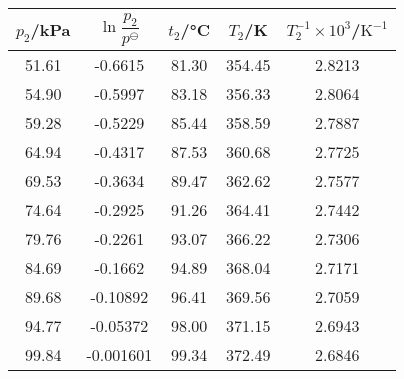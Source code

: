 \begin{table}[htbp]
    \centering
    \begin{tabular}{ccccc}
        \toprule
        $p_2$/\si{kPa} & $\ln\dfrac{p_2}{p^\ominus}$ & $t_2$/\si{\celsius} & $T_2$/\si{K} & $T_2^{-1}\times10^{3} $/$\mathrm{K^{-1}}$ \\
        \midrule
        51.61 & -0.6615 & 81.30 & 354.45 & 2.8213 \\
        54.90 & -0.5997 & 83.18 & 356.33 & 2.8064 \\
        59.28 & -0.5229 & 85.44 & 358.59 & 2.7887 \\
        64.94 & -0.4317 & 87.53 & 360.68 & 2.7725 \\
        69.53 & -0.3634 & 89.47 & 362.62 & 2.7577 \\
        74.64 & -0.2925 & 91.26 & 364.41 & 2.7442 \\
        79.76 & -0.2261 & 93.07 & 366.22 & 2.7306 \\
        84.69 & -0.1662 & 94.89 & 368.04 & 2.7171 \\
        89.68 & -0.10892 & 96.41 & 369.56 & 2.7059 \\
        94.77 & -0.05372 & 98.00 & 371.15 & 2.6943 \\
        99.84 & -0.001601 & 99.34 & 372.49 & 2.6846 \\
        \bottomrule
        \end{tabular}
    \label{tab:4}
\end{table}


